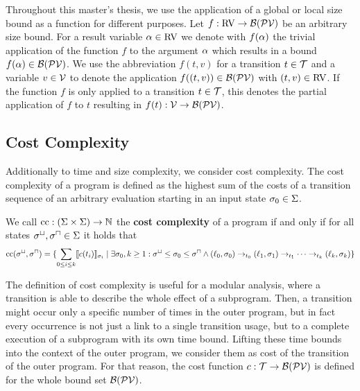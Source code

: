 Throughout this master's thesis, we use the application of a global or local size bound as a function for different purposes.
Let $f: \text{RV} \rightarrow \mathcal{B}(\mathcal{PV})$ be an arbitrary size bound.
For a result variable $\alpha \in \text{RV}$ we denote with $f(\alpha)$ the trivial application of the function $f$ to the argument $\alpha$ which results in a bound $f(\alpha) \in \mathcal{B}(\mathcal{PV})$.
We use the abbreviation $f(t, v)$ for a transition $t \in \mathcal{T}$ and a variable $v \in \mathcal{V}$ to denote the application $f((t,v)) \in \mathcal{B}(\mathcal{PV})$ with $(t,v) \in \text{RV}$.
If the function $f$ is only applied to a transition $t \in \mathcal{T}$, this denotes the partial application of $f$ to $t$ resulting in $f(t): \mathcal{V} \rightarrow \mathcal{B}(\mathcal{PV})$.

\subsection{Cost Complexity}

Additionally to time and size complexity, we consider cost complexity.
The cost complexity of a program is defined as the highest sum of the costs of a transition sequence of an arbitrary evaluation starting in an input state $\sigma_0 \in \Sigma$.

\begin{definition}
  We call $\text{cc}: (\Sigma \times \Sigma) \rightarrow \mathbb{N}$ the \textbf{cost complexity} of a program if and only if for all states ${\sigma^\sqcup}, {\sigma^\sqcap} \in \Sigma$ it holds that
  \[ \text{cc}({\sigma^\sqcup}, {\sigma^\sqcap}) = \lbrace  \sum_{0 \leq i \leq k} \llbracket c(t_i) \rrbracket_{\sigma_i} \mid \exists \sigma_0, k \geq 1: {\sigma^\sqcup} \leq \sigma_0 \leq {\sigma^\sqcap} \wedge (\ell_0, \sigma_0) \rightarrow_{t_0} (\ell_1, \sigma_1) \rightarrow_{t_1} \dots \rightarrow_{t_k} (\ell_k, \sigma_k)  \rbrace \]
\end{definition}

The definition of cost complexity is useful for a modular analysis, where a transition is able to describe the whole effect of a subprogram.
Then, a transition might occur only a specific number of times in the outer program, but in fact every occurrence is not just a link to a single transition usage, but to a complete execution of a subprogram with its own time bound.
Lifting these time bounds into the context of the outer program, we consider them as cost of the transition of the outer program. 
For that reason, the cost function $c: \mathcal{T} \rightarrow \mathcal{B}(\mathcal{PV})$ is defined for the whole bound set $\mathcal{B}(\mathcal{PV})$.

